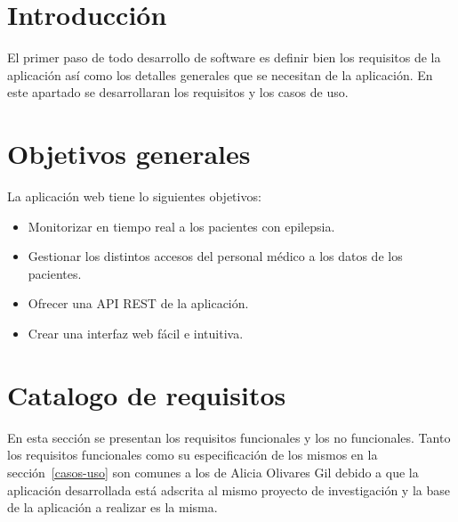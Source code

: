 
\section{Introducción}

El primer paso de todo desarrollo de software es definir bien los requisitos de la aplicación así como los detalles generales que se necesitan de la aplicación. En este apartado se desarrollaran los requisitos y los casos de uso.

\section{Objetivos generales}

La aplicación web tiene lo siguientes objetivos:
\begin{itemize}
	\tightlist
	\item
	Monitorizar en tiempo real a los pacientes con epilepsia.
	\item 
	Gestionar los distintos accesos del personal médico a los datos de los pacientes.
	\item 
	Ofrecer una API REST de la aplicación.
	\item 
	Crear una interfaz web fácil e intuitiva.
\end{itemize}

\section{Catalogo de requisitos}
En esta sección se presentan los requisitos funcionales y los no funcionales. Tanto los requisitos funcionales como su especificación de los mismos en la sección~\ref{casos-uso} son comunes a los de Alicia Olivares Gil debido a que la aplicación desarrollada está adscrita al mismo proyecto de investigación y la base de la aplicación a realizar es la misma.
